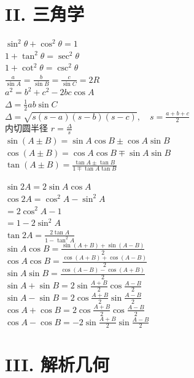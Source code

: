 \section*{II. 三角学}

\begin{minipage}[t]{0.5\textwidth}
$\sin^{2}\theta + \cos^{2}\theta = 1$ \\
$1 + \tan^{2}\theta = \sec^{2}\theta$ \\
$1 + \cot^{2}\theta = \csc^{2}\theta$ \\[10pt]
$\frac{a}{\sin A} = \frac{b}{\sin B} = \frac{c}{\sin C} = 2R$ \\
$a^{2} = b^{2} + c^{2} - 2bc \cos A$ \\[8pt]
$\Delta = \frac{1}{2}ab \sin C$ \\
$\Delta = \sqrt{s(s-a)(s-b)(s-c)}, \quad s = \frac{a+b+c}{2}$ \\[10pt]
内切圆半径 $r = \frac{\Delta}{s}$ \\[10pt]
$\sin(A \pm B) = \sin A \cos B \pm \cos A \sin B$ \\
$\cos(A \pm B) = \cos A \cos B \mp \sin A \sin B$ \\
$\tan(A \pm B) = \frac{\tan A \pm \tan B}{1 \mp \tan A \tan B}$
\end{minipage}
\begin{minipage}[t]{0.5\textwidth}
$\sin 2A = 2 \sin A \cos A$ \\
$\cos 2A = \cos^{2}A - \sin^{2}A$ \\
\phantom{$\cos 2A$} $= 2 \cos^{2}A - 1$ \\
\phantom{$\cos 2A$} $= 1 - 2 \sin^{2}A$ \\
$\tan 2A = \frac{2 \tan A}{1 - \tan^{2}A}$ \\[10pt]
$\sin A \cos B = \frac{\sin(A+B) + \sin(A-B)}{2}$ \\
$\cos A \cos B = \frac{\cos(A+B) + \cos(A-B)}{2}$ \\
$\sin A \sin B = \frac{\cos(A-B) - \cos(A+B)}{2}$ \\[10pt]
$\sin A + \sin B = 2 \sin \frac{A+B}{2} \cos \frac{A-B}{2}$ \\
$\sin A - \sin B = 2 \cos \frac{A+B}{2} \sin \frac{A-B}{2}$ \\
$\cos A + \cos B = 2 \cos \frac{A+B}{2} \cos \frac{A-B}{2}$ \\
$\cos A - \cos B = -2 \sin \frac{A+B}{2} \sin \frac{A-B}{2}$
\end{minipage}

\newpage

\section*{III. 解析几何}

